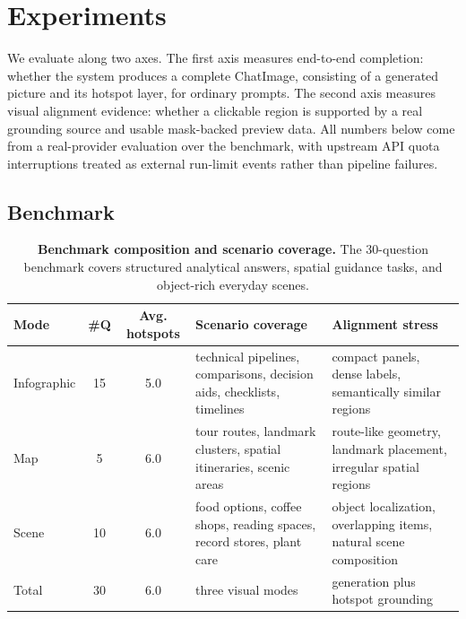 \section{Experiments}
\label{sec:experiments}
\begingroup
\setlength{\textfloatsep}{8pt plus 2pt minus 2pt}
\setlength{\floatsep}{6pt plus 2pt minus 2pt}
\setlength{\intextsep}{6pt plus 2pt minus 2pt}

We evaluate \method{} along two axes. The first axis measures end-to-end
completion: whether the system produces a complete ChatImage, consisting of a
generated picture and its hotspot layer, for ordinary prompts. The second axis
measures visual alignment evidence: whether a clickable region is supported by
a real grounding source and usable mask-backed preview data. All numbers below
come from a real-provider evaluation over the benchmark, with upstream API
quota interruptions treated as external run-limit events rather than pipeline
failures.

\subsection{Benchmark}
\label{sec:experiments_benchmark}

\begin{table}[H]
    \centering
    \scriptsize
    \setlength{\tabcolsep}{4pt}
    \renewcommand{\arraystretch}{1.07}
    \caption{\textbf{Benchmark composition and scenario coverage.} The
    30-question benchmark covers structured analytical answers, spatial
    guidance tasks, and object-rich everyday scenes.}
    \label{tab:benchmark_split}
    \begin{tabularx}{0.98\linewidth}{@{}lcc>{\raggedright\arraybackslash}X>{\raggedright\arraybackslash}X@{}}
        \toprule
        Mode & \#Q & Avg. hotspots & Scenario coverage & Alignment stress \\
        \midrule
        Infographic & 15 & 5.0 &
        technical pipelines, comparisons, decision aids, checklists, timelines &
        compact panels, dense labels, semantically similar regions \\
        Map & 5 & 6.0 &
        tour routes, landmark clusters, spatial itineraries, scenic areas &
        route-like geometry, landmark placement, irregular spatial regions \\
        Scene & 10 & 6.0 &
        food options, coffee shops, reading spaces, record stores, plant care &
        object localization, overlapping items, natural scene composition \\
        \midrule
        Total & 30 & 6.0 & three visual modes & generation plus hotspot grounding \\
        \bottomrule
    \end{tabularx}
    \vspace{-0.6em}
\end{table}

